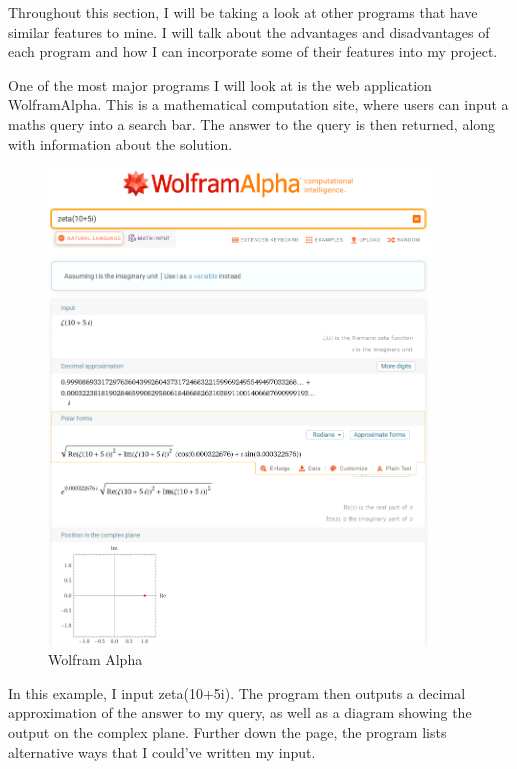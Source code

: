 \documentclass[12pt]{article}
\begin{document}
Throughout this section, I will be taking a look at other programs that have similar features to mine. I will talk about the advantages and disadvantages of each program and how I can incorporate some of their features into my project.


One of the most major programs I will look at is the web application WolframAlpha. This is a mathematical computation site, where users can input a maths query into a search bar. The answer to the query is then returned, along with information about the solution.
\begin{figure}[ht]
    \centering
    \captionsetup{justification=centering}
    \includegraphics[width=4in]{wolfram-alpha}
    \caption{Wolfram Alpha}
\end{figure}

In this example, I input zeta(10+5i). The program then outputs a decimal approximation of the answer to my query, as well as a diagram showing the output on the complex plane. Further down the page, the program lists alternative ways that I could’ve written my input.
\end{document}
